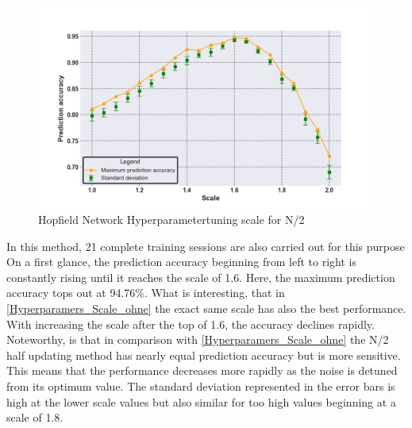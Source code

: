 \begin{figure}[H]
    \centering
    \includegraphics[width=0.8\linewidth]{graphics/NEW_Scale_MIT_N2_Half_Pred_Acc.png}
    \caption{Hopfield Network Hyperparametertuning scale for N/2}
    \label{Hyperparamers_Scale_mit}
\end{figure}
In this method, 21 complete training sessions are also carried out for this purpose
On a first glance, the prediction accuracy beginning from left to right is constantly rising until it reaches the scale of 1.6.
Here, the maximum prediction accuracy tops out at 94.76\%.
What is interesting, that in \ref{Hyperparamers_Scale_ohne} the exact same scale has also the best performance. 
With increasing the scale after the top of 1.6, the accuracy declines rapidly. 
Noteworthy, is that in comparison with \ref{Hyperparamers_Scale_ohne} the N/2 half updating method has nearly equal prediction accuracy
but is more sensitive. 
This means that the performance decreases more rapidly as the noise is detuned from its optimum value. 
The standard deviation represented in the error bars is high at the lower scale values but also similar for too high values beginning at a scale of 1.8.

